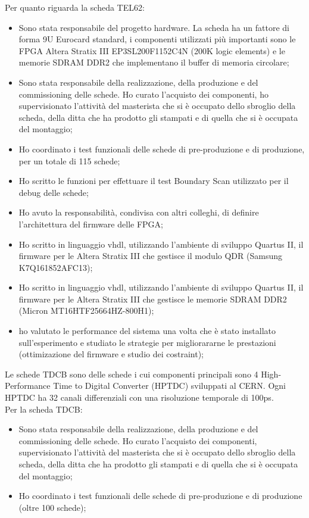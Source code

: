 \documentclass[10pt]{article}
\begin{document}
\noindent
Per quanto riguarda la scheda TEL62:
\begin{itemize}
\item Sono stata responsabile del progetto hardware. La scheda ha un fattore di forma 9U Eurocard standard, i componenti utilizzati pi\`u importanti sono le FPGA Altera\textsuperscript{\textregistered} Stratix III EP3SL200F1152C4N (200K logic elements) e le memorie SDRAM DDR2 che implementano il buffer di memoria circolare;
\item Sono stata responsabile  della realizzazione, della produzione e del commissioning delle schede. Ho curato l'acquisto dei componenti, ho supervisionato l'attivit\`a del masterista che si \`e occupato dello sbroglio della scheda, della ditta che ha prodotto gli stampati e di quella che si \`e occupata del montaggio;
\item  Ho coordinato i test funzionali delle schede di pre-produzione e di produzione, per un totale di 115 schede; 
\item  Ho scritto le funzioni per effettuare il test Boundary Scan utilizzato per il debug delle schede;
\item Ho avuto la responsabilit\`a, condivisa con altri colleghi, di definire l'architettura del firmware delle FPGA;
\item Ho scritto in linguaggio vhdl, utilizzando l'ambiente di sviluppo Quartus II, il firmware per le Altera\textsuperscript{\textregistered} Stratix III  che gestisce il modulo  QDR  (Samsung K7Q161852AFC13);
\item Ho scritto in linguaggio vhdl, utilizzando l'ambiente di sviluppo Quartus II, il firmware per le Altera\textsuperscript{\textregistered} Stratix III che gestisce le memorie SDRAM DDR2 (Micron MT16HTF25664HZ-800H1);
\item ho valutato le performance del sistema una volta che \`e stato installato sull'esperimento e studiato le strategie per migliorararne le prestazioni (ottimizazione del firmware e studio dei costraint);
\end {itemize}
Le schede TDCB sono delle schede i cui componenti principali sono 4 High-Performance Time to Digital Converter (HPTDC) sviluppati al CERN. Ogni HPTDC ha 32 canali differenziali con una risoluzione temporale di 100ps.\\

\noindent
Per la scheda TDCB:
\begin {itemize}
\item Sono stata responsabile  della realizzazione, della produzione e del commissioning delle schede. Ho curato l'acquisto dei componenti, supervisionato l'attivit\`a del masterista che si \`e occupato dello sbroglio della scheda, della ditta che ha prodotto gli stampati e di quella che si \`e occupata del montaggio;
\item  Ho coordinato i test funzionali delle schede di pre-produzione e di produzione (oltre 100 schede);
\end {itemize}
\end{document}

